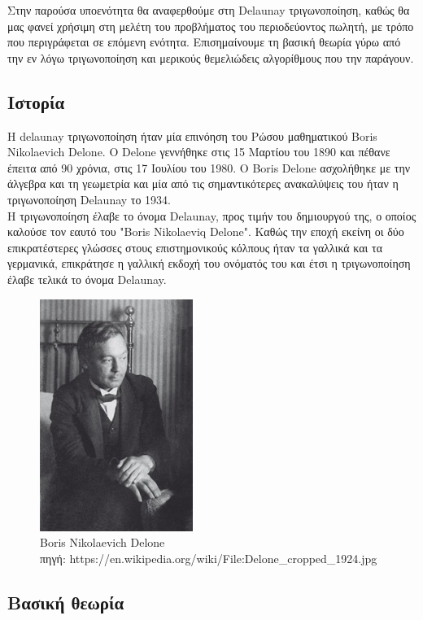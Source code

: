 \documentclass[oneside,12pt]{book}
\newenvironment{matlab}
	{\begin{figure}[hp]\centering\captionsetup{justification=centering}}
	{\end{figure}}
\theoremstyle{definition}
\begin{document}
Στην παρούσα υποενότητα θα αναφερθούμε στη Delaunay τριγωνοποίηση, καθώς θα μας φανεί χρήσιμη στη μελέτη του προβλήματος του περιοδεύοντος πωλητή, με τρόπο που περιγράφεται σε επόμενη ενότητα. Επισημαίνουμε τη βασική θεωρία γύρω από την εν λόγω τριγωνοποίηση και μερικούς θεμελιώδεις αλγορίθμους που την παράγουν. \\

\subsection{Ιστορία}

Η delaunay τριγωνοποίηση ήταν μία επινόηση του Ρώσου μαθηματικού Boris Nikolaevich Delone. Ο Delone γεννήθηκε στις 15 Μαρτίου του 1890 και πέθανε έπειτα από 90 χρόνια, στις 17 Ιουλίου του 1980. Ο Boris Delone ασχολήθηκε με την άλγεβρα και τη γεωμετρία και μία από τις σημαντικότερες ανακαλύψεις του ήταν η τριγωνοποίηση Delaunay το 1934. \\

Η τριγωνοποίηση έλαβε το όνομα Delaunay, προς τιμήν του δημιουργού της, ο οποίος καλούσε τον εαυτό του "Boris Nikolaeviq Delone". Καθώς την εποχή εκείνη οι δύο επικρατέστερες γλώσσες στους επιστημονικούς κόλπους ήταν τα γαλλικά και τα γερμανικά, επικράτησε η γαλλική εκδοχή του ονόματός του και έτσι η τριγωνοποίηση έλαβε τελικά το όνομα Delaunay. \\

\begin{matlab}
	\includegraphics[scale=0.9]{images/Delone.jpg}
	\caption{Boris Nikolaevich Delone \\ πηγή: https://en.wikipedia.org/wiki/File:Delone\_cropped\_1924.jpg}
\end{matlab}

\subsection{Βασική θεωρία}
\end{document}
